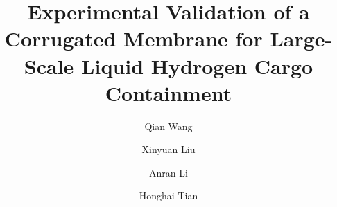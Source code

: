 \documentclass[final]{beamer}
\title{Experimental Validation of a Corrugated Membrane for Large-Scale Liquid Hydrogen Cargo Containment}
\author{Qian Wang \and Xinyuan Liu \and Anran Li \and Honghai Tian}
\institute[ZIAC]{Zhongshan Institute of Advanced Cryogenic Technology, China}
\newlength{\sepwidth}
\newlength{\colwidth}
\newcommand{\separatorcolumn}{\begin{column}{\sepwidth}\end{column}}
\begin{document}
\begin{frame}[t]

\begin{columns}[t]
\separatorcolumn

\begin{column}{\colwidth}


%
%
\end{column}

\separatorcolumn

\begin{column}{\colwidth}
%
%
%
\end{column}

\separatorcolumn
\end{columns}

\end{frame}
\end{document}
